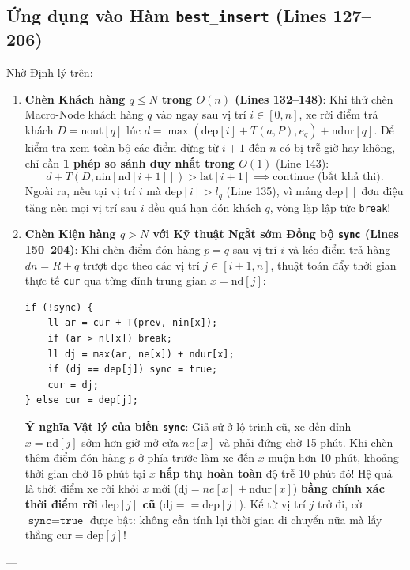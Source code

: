 \documentclass[11pt,a4paper]{article}
\theoremstyle{definition}
\begin{document}
\subsection{Ứng dụng vào Hàm \texttt{best\_insert} (Lines 127--206)}
Nhờ Định lý trên:
\begin{enumerate}[leftmargin=1.5em]
    \item \textbf{Chèn Khách hàng $q \le N$ trong $O(n)$ (Lines 132--148)}:
    Khi thử chèn Macro-Node khách hàng $q$ vào ngay sau vị trí $i \in [0, n]$, xe rời điểm trả khách $D = \text{nout}[q]$ lúc $d = \max(\text{dep}[i] + T(a, P), e_q) + \text{ndur}[q]$. Để kiểm tra xem toàn bộ các điểm dừng từ $i+1$ đến $n$ có bị trễ giờ hay không, chỉ cần \textbf{1 phép so sánh duy nhất trong $O(1)$} (Line 143):
    \[
        d + T(D, \text{nin}[\text{nd}[i+1]]) > \text{lat}[i+1] \implies \text{continue (bất khả thi).}
    \]
    Ngoài ra, nếu tại vị trí $i$ mà $\text{dep}[i] > l_q$ (Line 135), vì mảng $\text{dep}[]$ đơn điệu tăng nên mọi vị trí sau $i$ đều quá hạn đón khách $q$, vòng lặp lập tức \texttt{break}!
    \item \textbf{Chèn Kiện hàng $q > N$ với Kỹ thuật Ngắt sớm Đồng bộ \texttt{sync} (Lines 150--204)}:
    Khi chèn điểm đón hàng $p = q$ sau vị trí $i$ và kéo điểm trả hàng $dn = R+q$ trượt dọc theo các vị trí $j \in [i+1, n]$, thuật toán đẩy thời gian thực tế \texttt{cur} qua từng đỉnh trung gian $x = \text{nd}[j]$:
    \begin{lstlisting}
if (!sync) {
    ll ar = cur + T(prev, nin[x]);
    if (ar > nl[x]) break;
    ll dj = max(ar, ne[x]) + ndur[x];
    if (dj == dep[j]) sync = true;
    cur = dj;
} else cur = dep[j];
    \end{lstlisting}
    \textbf{Ý nghĩa Vật lý của biến \texttt{sync}}: Giả sử ở lộ trình cũ, xe đến đỉnh $x = \text{nd}[j]$ sớm hơn giờ mở cửa $ne[x]$ và phải đứng chờ 15 phút. Khi chèn thêm điểm đón hàng $p$ ở phía trước làm xe đến $x$ muộn hơn 10 phút, khoảng thời gian chờ 15 phút tại $x$ \textbf{hấp thụ hoàn toàn} độ trễ 10 phút đó! Hệ quả là thời điểm xe rời khỏi $x$ mới ($\text{dj} = ne[x] + \text{ndur}[x]$) \textbf{bằng chính xác thời điểm rời $\text{dep}[j]$ cũ} ($\text{dj} == \text{dep}[j]$). Kể từ vị trí $j$ trở đi, cờ $\texttt{sync} = \texttt{true}$ được bật: không cần tính lại thời gian di chuyển nữa mà lấy thẳng $\text{cur} = \text{dep}[j]$!
\end{enumerate}

---

\end{document}
